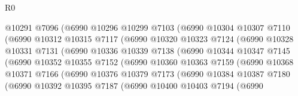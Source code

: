 \begin{lexlean}{R0}
\begin{coremodule}
                        @10291
                        @7096
                        (@6990
                          @10296
                          @10299
                          @7103
                          (@6990
                            @10304
                            @10307
                            @7110
                            (@6990
                              @10312
                              @10315
                              @7117
                              (@6990
                                @10320
                                @10323
                                @7124
                                (@6990
                                  @10328
                                  @10331
                                  @7131
                                  (@6990
                                    @10336
                                    @10339
                                    @7138
                                    (@6990
                                      @10344
                                      @10347
                                      @7145
                                      (@6990
                                        @10352
                                        @10355
                                        @7152
                                        (@6990
                                          @10360
                                          @10363
                                          @7159
                                          (@6990
                                            @10368
                                            @10371
                                            @7166
                                            (@6990
                                              @10376
                                              @10379
                                              @7173
                                              (@6990
                                                @10384
                                                @10387
                                                @7180
                                                (@6990
                                                  @10392
                                                  @10395
                                                  @7187
                                                  (@6990
                                                    @10400
                                                    @10403
                                                    @7194
                                                    (@6990

\end{coremodule}
\end{lexlean}
